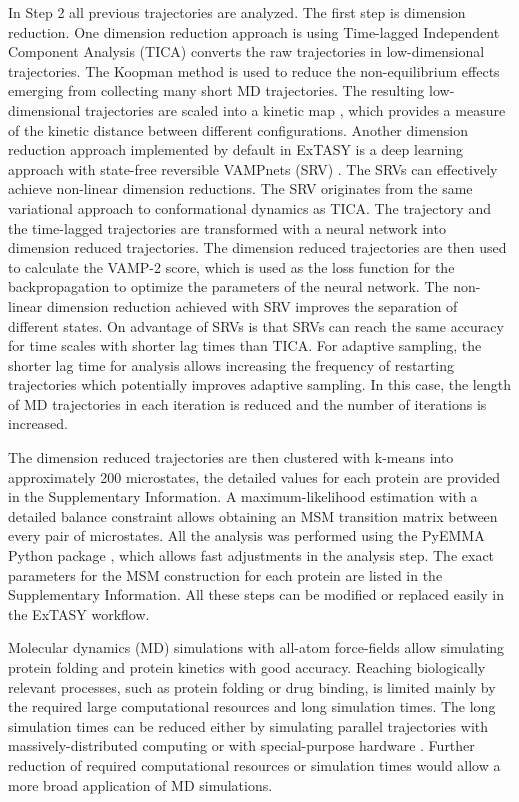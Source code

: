 In Step 2 all previous trajectories are analyzed. The first step is dimension reduction. One dimension reduction approach is using Time-lagged
Independent Component Analysis (TICA) \cite{TICA1-perez2013, TICA2-schwantes2013} converts the raw trajectories in
low-dimensional trajectories. The Koopman method \cite{koopmanold,
koopman2,koopman3,koopman4, wu2017variational, Nueske2017} is used to reduce
the non-equilibrium effects emerging from collecting many short MD trajectories. The
resulting low-dimensional trajectories are scaled into a kinetic map
\cite{Noe2015,noe2016commute}, which provides a measure of the kinetic distance
between different configurations. Another dimension reduction approach implemented by default in ExTASY is a deep learning approach with state-free reversible VAMPnets (SRV) \cite{Mardt2018,chen2019jcp}. The SRVs can effectively achieve non-linear dimension reductions. The SRV originates from the same variational
approach to conformational dynamics as TICA. The trajectory and the time-lagged trajectories are transformed with a neural network into dimension reduced trajectories. The dimension reduced trajectories are then used to calculate the VAMP-2 score, which is used as the loss function for the backpropagation to optimize the parameters of the neural network. The non-linear dimension reduction achieved with SRV improves the separation of different states. On advantage of SRVs is that SRVs can reach the same accuracy for time scales with shorter lag times than TICA. For adaptive sampling, the shorter lag time for analysis allows increasing the frequency of restarting trajectories which potentially improves adaptive sampling. In this case, the length of MD trajectories in each iteration is reduced and the number of iterations is increased.

The dimension reduced trajectories are then clustered with k-means into approximately 200 microstates,
the detailed values for each protein are provided in the Supplementary Information. 
A  maximum-likelihood estimation with a detailed balance
constraint \cite{prinz2011markov} allows obtaining an MSM transition matrix 
between every pair of microstates. All the analysis was
performed using the PyEMMA Python package \cite{scherer2015pyemma}, which
allows fast adjustments in the analysis step. The exact parameters for the MSM
construction for each protein are listed in the
Supplementary Information. All these steps can be modified or replaced easily in the
ExTASY workflow. 

Molecular dynamics (MD) simulations with all-atom force-fields allow simulating
protein folding and protein kinetics with good accuracy. Reaching biologically
relevant processes, such as protein folding or drug binding, is limited mainly
by the required large computational resources and long simulation times. The
long simulation times can be reduced either by simulating parallel trajectories
with massively-distributed computing \cite{DistComp-Shirts2000,
DistComp-Buch2010} or with special-purpose hardware \cite{shaw2014anton}.
Further reduction of required computational resources or simulation times would
allow a more broad application of MD simulations.

